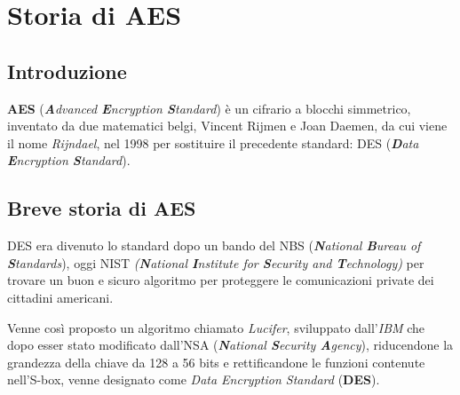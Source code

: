 
\chapter{Storia di AES}




\section{Introduzione}

  

\textsf{\small \textbf{AES} (\emph{\textbf{A}dvanced \textbf{E}ncryption \textbf{S}tandard}) è un cifrario a blocchi simmetrico, inventato da due matematici belgi, Vincent Rijmen e Joan Daemen, da cui viene il nome \emph{Rijndael}, nel 1998 per sostituire il precedente standard: DES (\emph{\textbf{D}ata \textbf{E}ncryption \textbf{S}tandard}).}



\section{Breve storia di AES} 

     

\textsf{\small DES era divenuto lo standard dopo un bando del NBS (\emph{\textbf{N}ational \textbf{B}ureau of \textbf{S}tandards}), oggi NIST \emph{(\textbf{N}ational \textbf{I}nstitute for \textbf{S}ecurity and \textbf{T}echnology)} per trovare un buon e sicuro algoritmo per proteggere le comunicazioni private dei cittadini americani.}


\textsf{\small Venne così proposto un algoritmo chiamato \emph{Lucifer}, sviluppato dall'\emph{IBM} che dopo esser stato modificato dall'NSA (\emph{\textbf{N}ational \textbf{S}ecurity \textbf{A}gency}), riducendone la grandezza della chiave da 128 a 56 bits e rettificandone le funzioni contenute nell'S-box, venne designato come \emph{Data Encryption Standard} (\textbf{DES}).}

